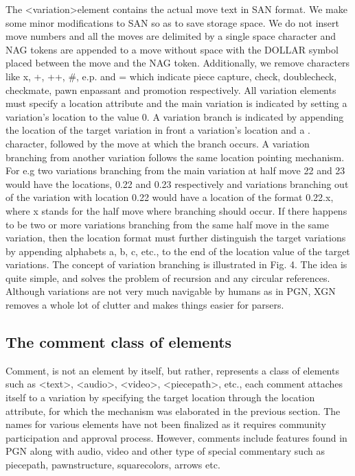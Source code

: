 \documentclass[conference]{IEEEtran}
\begin{document}
The \textless variation\textgreater  element contains the actual move text in SAN format. We make some minor modifications to SAN so as to save storage space. We do not insert move numbers and all the moves are delimited by a single space character and NAG tokens are appended to a move without space with the DOLLAR symbol placed between the move and the NAG token. Additionally, we remove characters like x, +, ++, \#, e.p. and = which indicate piece capture, check, double\textendash check, checkmate, pawn en\textendash passant and promotion respectively. All variation elements must specify a location attribute and the main variation is indicated by setting a variation's location to the value 0. A variation branch is indicated by appending the location of the target variation in front a variation's location and a . character, followed by the move at which the branch occurs. A variation branching from another variation follows the same location pointing mechanism. For e.g two variations branching from the main variation at half move 22 and 23 would have the locations, 0.22 and 0.23 respectively and variations branching out of the variation with location 0.22 would have a location of the format 0.22.x, where x stands for the half move where branching should occur. If there happens to be two or more variations branching from the same half move in the same variation, then the location format must further distinguish the target variations by appending alphabets a, b, c, etc., to the end of the location value of the target variations. The concept of variation branching is illustrated in Fig. 4. The idea is quite simple, and solves the problem of recursion and any circular references. Although variations are not very much navigable by humans as in PGN, XGN removes a whole lot of clutter and makes things easier for parsers.




\subsection{The comment class of elements}

Comment, is not an element by itself, but rather, represents a class of elements such as \textless text\textgreater , \textless audio\textgreater , \textless video\textgreater , \textless piecepath\textgreater , etc., each comment attaches itself to a variation by specifying the target location through the location attribute, for which the mechanism was elaborated in the previous section. The names for various elements have not been finalized as it requires community participation and approval process. However, comments include features found in PGN along with audio, video and other type of special commentary such as piece\textendash path, pawn\textendash structure, square\textendash colors, arrows etc.
\end{document}
